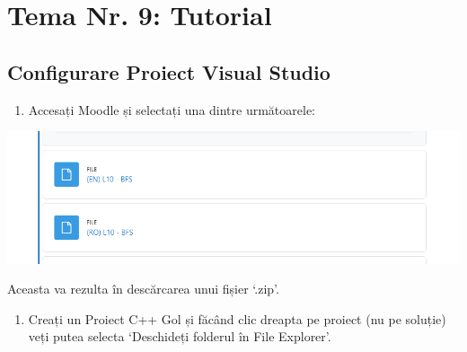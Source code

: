 \documentclass[../ro-fa-lab.tex]{subfiles}
\begin{document}
\section{\texorpdfstring{\textbf{Tema Nr. 9: Tutorial}}{Tema Nr. 9: Tutorial}}\label{assign9}


\subsection{Configurare Proiect Visual Studio}\label{visual-studio-project-setup}

\begin{enumerate}
\def\labelenumi{\arabic{enumi}.}
\item
  Accesați Moodle și selectați una dintre următoarele:
\end{enumerate}

\includegraphics[width=\textwidth,alt={A white rectangular object with a black border Description automatically generated with medium confidence}]{./Resources/tutorial_lab9/image1.png}

Aceasta va rezulta în descărcarea unui fișier `.zip'.

\begin{enumerate}
\def\labelenumi{\arabic{enumi}.}
\setcounter{enumi}{1}
\item
  Creați un Proiect C++ Gol și făcând clic dreapta pe proiect (nu pe soluție) veți putea selecta `Deschideți folderul în File Explorer'.
\end{enumerate}
\end{document}
